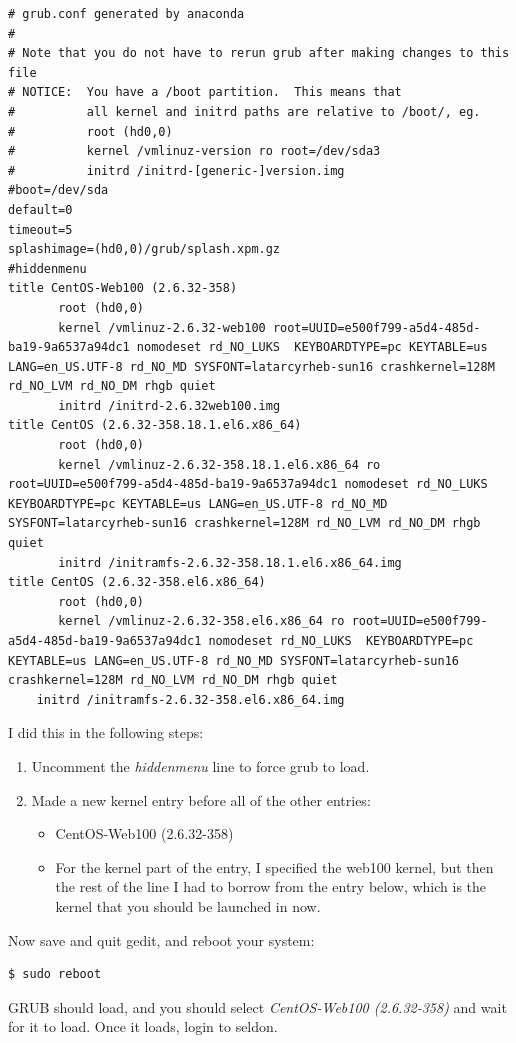 \begin{snugshade}\begin{lstlisting}
# grub.conf generated by anaconda
#
# Note that you do not have to rerun grub after making changes to this file
# NOTICE:  You have a /boot partition.  This means that
#          all kernel and initrd paths are relative to /boot/, eg.
#          root (hd0,0)
#          kernel /vmlinuz-version ro root=/dev/sda3
#          initrd /initrd-[generic-]version.img
#boot=/dev/sda
default=0
timeout=5
splashimage=(hd0,0)/grub/splash.xpm.gz
#hiddenmenu
title CentOS-Web100 (2.6.32-358)
       root (hd0,0)
       kernel /vmlinuz-2.6.32-web100 root=UUID=e500f799-a5d4-485d-ba19-9a6537a94dc1 nomodeset rd_NO_LUKS  KEYBOARDTYPE=pc KEYTABLE=us LANG=en_US.UTF-8 rd_NO_MD SYSFONT=latarcyrheb-sun16 crashkernel=128M rd_NO_LVM rd_NO_DM rhgb quiet
       initrd /initrd-2.6.32web100.img
title CentOS (2.6.32-358.18.1.el6.x86_64)
       root (hd0,0)
       kernel /vmlinuz-2.6.32-358.18.1.el6.x86_64 ro root=UUID=e500f799-a5d4-485d-ba19-9a6537a94dc1 nomodeset rd_NO_LUKS  KEYBOARDTYPE=pc KEYTABLE=us LANG=en_US.UTF-8 rd_NO_MD SYSFONT=latarcyrheb-sun16 crashkernel=128M rd_NO_LVM rd_NO_DM rhgb quiet
       initrd /initramfs-2.6.32-358.18.1.el6.x86_64.img
title CentOS (2.6.32-358.el6.x86_64)
       root (hd0,0)
       kernel /vmlinuz-2.6.32-358.el6.x86_64 ro root=UUID=e500f799-a5d4-485d-ba19-9a6537a94dc1 nomodeset rd_NO_LUKS  KEYBOARDTYPE=pc KEYTABLE=us LANG=en_US.UTF-8 rd_NO_MD SYSFONT=latarcyrheb-sun16 crashkernel=128M rd_NO_LVM rd_NO_DM rhgb quiet
	initrd /initramfs-2.6.32-358.el6.x86_64.img
\end{lstlisting}\end{snugshade}\noindent
I did this in the following steps: 
\begin{enumerate}
\item{Uncomment the \textit{hiddenmenu} line to force grub to load.}
\item{Made a new kernel entry before all of the other entries: }
\begin{itemize}
\item{CentOS-Web100 (2.6.32-358)}
\item{For the kernel part of the entry, I specified the web100 kernel, but then the rest of the line I had to borrow from the entry below, which is the kernel that you should be launched in now.}
\end{itemize}
\end{enumerate}
Now save and quit gedit, and reboot your system:
\begin{snugshade}\begin{verbatim}
$ sudo reboot
\end{verbatim}\end{snugshade}\noindent
GRUB should load, and you should select \textit{CentOS-Web100 (2.6.32-358)} and wait for it to load. Once it loads, login to seldon.
































\newpage
